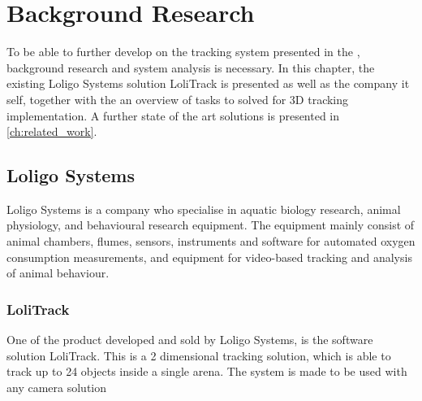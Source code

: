 \chapter{Background Research}\glsresetall
\label{cha:Research}
To be able to further develop on the tracking system presented in the , background research and system analysis is necessary. In this chapter, the existing Loligo Systems solution LoliTrack is presented as well as the company it self, together with the an overview of tasks to solved for 3D tracking implementation. A further state of the art solutions is presented in \autoref{ch:related_work}.

\section{Loligo Systems}
Loligo Systems is a company who specialise in aquatic biology research, animal physiology, and  behavioural research equipment. The equipment mainly consist of animal chambers, flumes, sensors, instruments and software for automated oxygen consumption measurements, and equipment for video-based tracking and analysis of animal behaviour.

\subsection{LoliTrack}
One of the product developed and sold by Loligo Systems, is the software solution LoliTrack. This is a 2 dimensional tracking solution, which is able to track up to 24 objects inside a single arena. The system is made to be used with any camera solution